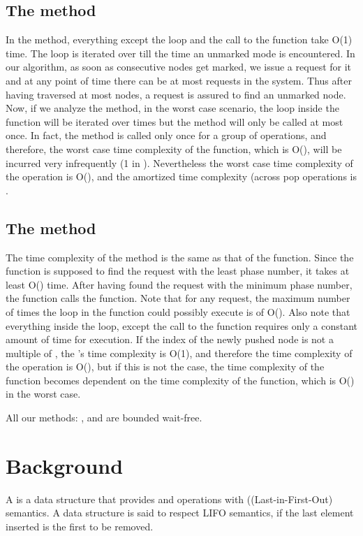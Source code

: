 \documentclass{llncs}
\begin{document}
\begin{appendix}
\subsection{The  method}
In the  method, everything except the  loop and the call to the 
 function take O(1) time. The  loop is iterated over till 
the time an unmarked mode is encountered. In our algorithm, as soon as  
consecutive nodes get marked, we issue a  request for it and at 
any point of time there can be at most   requests in the system. 
Thus after having traversed at most  nodes, a  request is assured to 
find an unmarked node. Now, if we analyze the  method, 
in the worst case scenario, the  loop inside the function will be iterated over 
 times but the  method will only be called at most once. In fact, the  
method is called only once for a group of  operations, and therefore, the worst case 
time complexity of the  function, which is O(), will be incurred very infrequently
(1 in ). 
Nevertheless the worst case time complexity of the  operation is O(), and the
amortized time complexity (across  pop operations is . 

\subsection{The  method \label{push_time_complexity}}
The time complexity of the  method is the same as that of the  function. 
Since the  function is supposed to find the request with the least phase number, 
it takes at least O() time. After having found the request with the minimum 
phase number, the  function calls the  function. Note that for any 
 request, the maximum number of times the  loop in the  
function could possibly execute is of O(). Also note that everything inside the  loop, 
except the call to the  function requires only a constant amount of 
time for execution. If the index of the newly pushed node is not a multiple of 
, the 's time complexity is O(1), and therefore the time complexity
of the  operation is O(), but if this is not the case, the time complexity 
of the  function becomes dependent on the time 
complexity of the  function, which is O() in the worst case. 

All our methods: ,  and  are bounded wait-free.

\section{Background}
\label{sec:back}

A  is a data structure that provides  and  operations with ((Last-in-First-Out) semantics.  A
data structure is said to respect LIFO semantics, if the last element inserted is the first to be removed.


\end{appendix}
\end{document}
